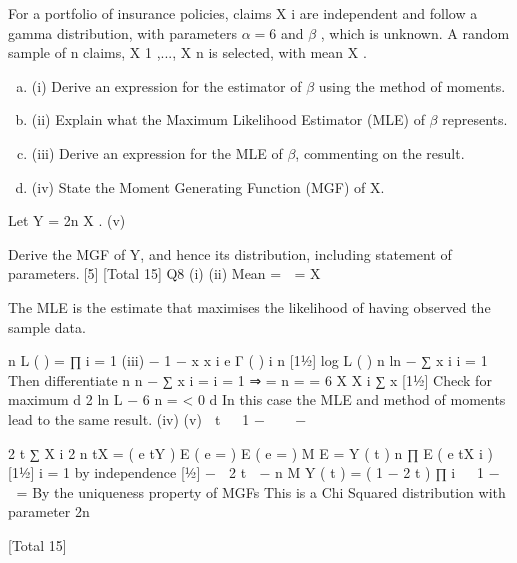 \documentclass[a4paper,12pt]{article}
\begin{document}

For a portfolio of insurance policies, claims X i are independent and follow a gamma
distribution, with parameters $\alpha  = 6$ and $\beta$ , which is unknown.
A random sample of n claims, X 1 ,..., X n is selected, with mean X .
\begin{enumerate}[(a)]
\item(i) Derive an expression for the estimator of $\beta$ using the method of moments. 
\item (ii) Explain what the Maximum Likelihood Estimator (MLE) of $\beta$  represents. 
\item (iii) Derive an expression for the MLE of $\beta$, commenting on the result.
\item (iv) State the Moment Generating Function (MGF) of X.
\end{enumerate}
Let Y = 2n \beta  X .
(v)


Derive the MGF of Y, and hence its distribution, including statement of
parameters.[5]
[Total 15]
\newpage 
Q8
(i)
(ii)
Mean = \alpha 
\alpha 
\beta  ⇒ \beta  = X

The MLE is the estimate that maximises the likelihood of having observed the
sample data.

n
L ( \beta  ) = ∏
i = 1
(iii)
\beta  \alpha  \alpha  − 1 − \beta  x
x i e
Γ ( \alpha  )
i
n
[11⁄2]
log L ( \beta  ) \propto n \alpha  ln \beta  − \beta  ∑ x i
i = 1
Then differentiate
n
n 
− ∑ x i =
\beta 
i = 1
⇒ \beta  = \alpha  n
= \alpha  = 6
X
X
i
∑ x
[11⁄2]
Check for maximum
d 2 ln L − 6 n
=
< 0
d  
In this case the MLE and method of moments lead to the same result. 
(iv)
(v)

t 
 1 − 
 \beta  
− \alpha 

2 \beta  t ∑ X i
2 n \beta  tX
=
( e tY ) E ( e =
) E ( e =
)
M
E =
Y ( t )
n
∏ E ( e  tX i
)
[11⁄2]
i = 1
by independence
[1⁄2]
− \alpha 
 2 \beta  t 
− n \alpha 
M Y ( t ) =
( 1 − 2 t )
∏ i   1 − \beta    =
By the uniqueness property of MGFs
This is a Chi Squared distribution with parameter 2n\alpha 



[Total 15]
\end{document}
